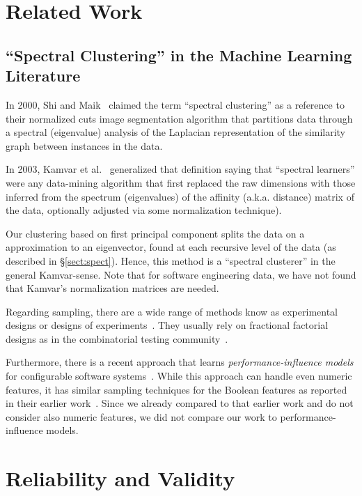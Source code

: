 \documentclass{sig-alternative}
\newcommand{\tion}[1]{\S\ref{sect:#1}}
\begin{document}
 \section{Related Work}
 \subsection{``Spectral Clustering'' in the  Machine Learning Literature}\label{sect:related}
 
In 2000, Shi and Maik~\cite{shi00} claimed the term ``spectral clustering'' as a reference to their normalized cuts
image
segmentation algorithm that  partitions data through a spectral (eigenvalue) analysis of the  
Laplacian representation of the similarity graph between instances in the data.

In 2003, Kamvar et al.~\cite{kamvar2003spectral}  generalized that definition saying that ``spectral learners''
were any data-mining algorithm that first replaced the raw
dimensions with those inferred from the spectrum (eigenvalues) of the affinity (a.k.a. distance)
matrix of the data, optionally adjusted via some normalization technique).

Our clustering based on first principal component splits the data on a   approximation to an eigenvector, found at each recursive level
of the data (as described in \tion{spect}). 
Hence, this  method is a ``spectral clusterer'' in the general Kamvar-sense. 
Note that
for software engineering data, we have
not found that Kamvar's normalization matrices are needed.

Regarding sampling, there are a wide range of methods know as experimental designs or designs of experiments~\cite{pukelsheim2006optimal}. They usually rely on fractional factorial designs as in the combinatorial testing community~\cite{Kuhn:2013}. 

Furthermore, there is a recent approach that learns {\em performance-influence models} for configurable software systems~\cite{SGA+15}. While this approach can handle even numeric features, it has similar sampling techniques for the Boolean features as reported in their earlier work~\cite{siegmund2012predicting}. Since we already compared to that earlier work and do not consider also numeric features, we did not compare our work to performance-influence models.
 


\section{Reliability and Validity}\label{sect:construct}
\end{document}
